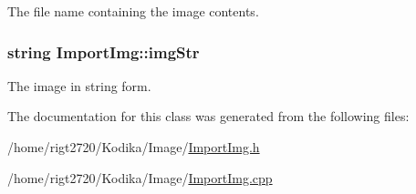 The file name containing the image contents. 

\hypertarget{classImportImg_a3529487bc41c4ae9a7926b09aec05305}{
\subsubsection[{img\-Str}]{\setlength{\rightskip}{0pt plus 5cm}string Import\-Img\-::img\-Str\hspace{0.3cm}{\ttfamily [private]}}}\label{classImportImg_a3529487bc41c4ae9a7926b09aec05305}


The image in string form. 



The documentation for this class was generated from the following files\-:\begin{DoxyCompactItemize}
\item 
/home/rigt2720/\-Kodika/\-Image/\hyperlink{ImportImg_8h}{Import\-Img.\-h}\item 
/home/rigt2720/\-Kodika/\-Image/\hyperlink{ImportImg_8cpp}{Import\-Img.\-cpp}\end{DoxyCompactItemize}
